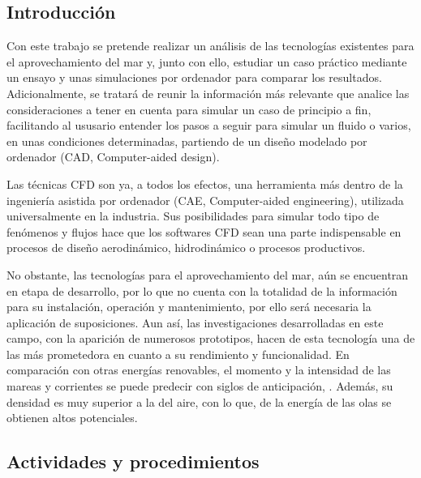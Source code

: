 \subsection{Introducción}\label{header-n2}

Con este trabajo se pretende realizar un análisis de las tecnologías
existentes para el aprovechamiento del mar y, junto con ello, estudiar
un caso práctico mediante un ensayo y unas simulaciones por ordenador
para comparar los resultados. Adicionalmente, se tratará de reunir la
información más relevante que analice las consideraciones a tener en
cuenta para simular un caso de principio a fin, facilitando al ususario
entender los pasos a seguir para simular un fluido o varios, en unas
condiciones determinadas, partiendo de un diseño modelado por ordenador
(CAD, Computer-aided design).

Las técnicas CFD son ya, a todos los efectos, una herramienta más dentro
de la ingeniería asistida por ordenador (CAE, Computer-aided
engineering), utilizada universalmente en la industria. Sus
posibilidades para simular todo tipo de fenómenos y flujos hace que los
softwares CFD sean una parte indispensable en procesos de diseño
aerodinámico, hidrodinámico o procesos productivos.

No obstante, las tecnologías para el aprovechamiento del mar, aún se
encuentran en etapa de desarrollo, por lo que no cuenta con la totalidad
de la información para su instalación, operación y mantenimiento, por
ello será necesaria la aplicación de suposiciones. Aun así, las
investigaciones desarrolladas en este campo, con la aparición de
numerosos prototipos, hacen de esta tecnología una de las más
prometedora en cuanto a su rendimiento y funcionalidad. En comparación
con otras energías renovables, el momento y la intensidad de las mareas
y corrientes se puede predecir con siglos de anticipación,
\cite{romerogarcia10}. Además, su densidad es muy superior a la del aire,
con lo que, de la energía de las olas se obtienen altos potenciales.

\subsection{Actividades y procedimientos}\label{header-n9}

